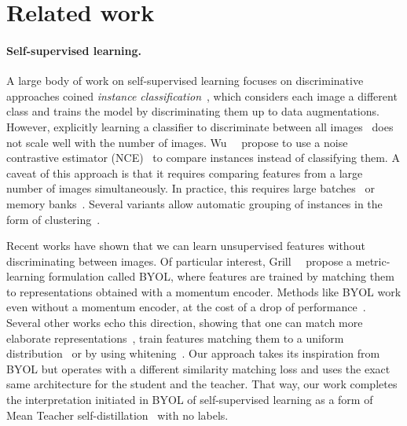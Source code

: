 \section{Related work}


\paragraph{Self-supervised learning.}
A large body of work on self-supervised learning focuses on discriminative approaches coined \emph{instance classification}~\cite{chen2020simple,dosovitskiy2016discriminative,he2020momentum,wu2018unsupervised},
which considers each image a different class and trains the model by discriminating them up to data augmentations.
However, explicitly learning a classifier to discriminate between all images~\cite{dosovitskiy2016discriminative} does not scale well with the number of images. 
Wu~\etal~\cite{wu2018unsupervised} propose to use a noise contrastive estimator (NCE)~\cite{gutmann2010noise} to compare instances instead of classifying them.
A caveat of this approach is that it requires comparing features from a large number of images simultaneously.
In practice, this requires large batches~\cite{chen2020simple} or memory banks~\cite{he2020momentum, wu2018unsupervised}.
Several variants allow automatic grouping of instances in the form of clustering~\cite{asano2019self,caron2018deep,caron2019unsupervised,huang2019unsupervised,junnan2021prototypical,xie2016unsupervised,yang2016joint,zhuang2019local}.

Recent works have shown that we can learn unsupervised features without discriminating between images.
Of particular interest, Grill~\etal~\cite{grill2020bootstrap} propose a metric-learning formulation called BYOL, where features are trained by matching them to representations obtained with a momentum encoder.
Methods like BYOL work even without a momentum encoder, at the cost of a drop of performance~\cite{chen2020exploring,grill2020bootstrap}.
Several other works echo this direction, showing that one can match more elaborate representations~\cite{gidaris2020learning,gidaris2020obow}, train features matching them to a uniform distribution~\cite{bojanowski2017unsupervised} or by using whitening~\cite{ermolov2020whitening,zbontar2021barlow}.
Our approach takes its inspiration from BYOL but operates with a different similarity matching loss and uses the exact same architecture for the student and the teacher.
That way, our work completes the interpretation initiated in BYOL of self-supervised learning as a form of Mean Teacher self-distillation~\cite{tarvainen2017mean} with no labels.


